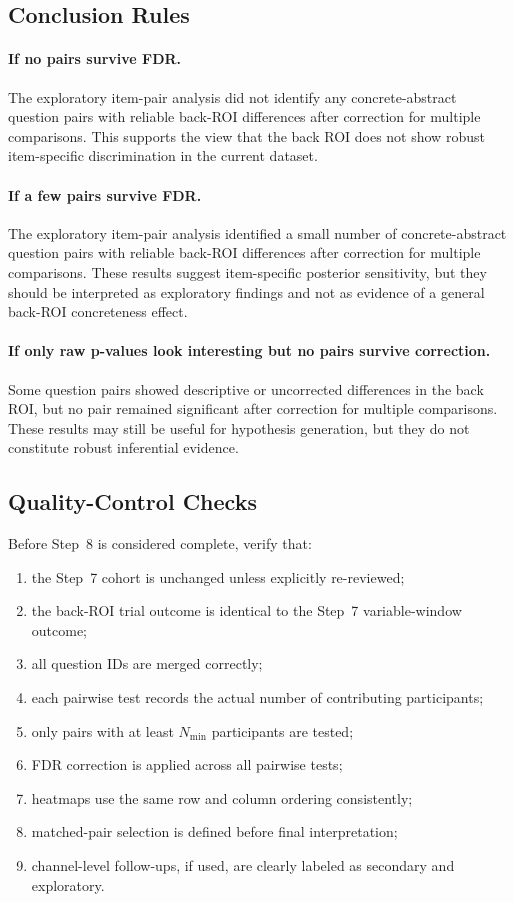 \documentclass[11pt]{article}
\begin{document}
\subsection{Conclusion Rules}

\paragraph{If no pairs survive FDR.}
The exploratory item-pair analysis did not identify any concrete-abstract question pairs with
reliable back-ROI differences after correction for multiple comparisons.
This supports the view that the back ROI does not show robust item-specific discrimination
in the current dataset.

\paragraph{If a few pairs survive FDR.}
The exploratory item-pair analysis identified a small number of concrete-abstract question pairs
with reliable back-ROI differences after correction for multiple comparisons.
These results suggest item-specific posterior sensitivity, but they should be interpreted as
exploratory findings and not as evidence of a general back-ROI concreteness effect.

\paragraph{If only raw p-values look interesting but no pairs survive correction.}
Some question pairs showed descriptive or uncorrected differences in the back ROI, but no pair
remained significant after correction for multiple comparisons.
These results may still be useful for hypothesis generation, but they do not constitute robust
inferential evidence.

\subsection{Quality-Control Checks}
Before Step~8 is considered complete, verify that:
\begin{enumerate}
    \item the Step~7 cohort is unchanged unless explicitly re-reviewed;
    \item the back-ROI trial outcome is identical to the Step~7 variable-window outcome;
    \item all question IDs are merged correctly;
    \item each pairwise test records the actual number of contributing participants;
    \item only pairs with at least \(N_{\min}\) participants are tested;
    \item FDR correction is applied across all pairwise tests;
    \item heatmaps use the same row and column ordering consistently;
    \item matched-pair selection is defined before final interpretation;
    \item channel-level follow-ups, if used, are clearly labeled as secondary and exploratory.
\end{enumerate}
\end{document}
